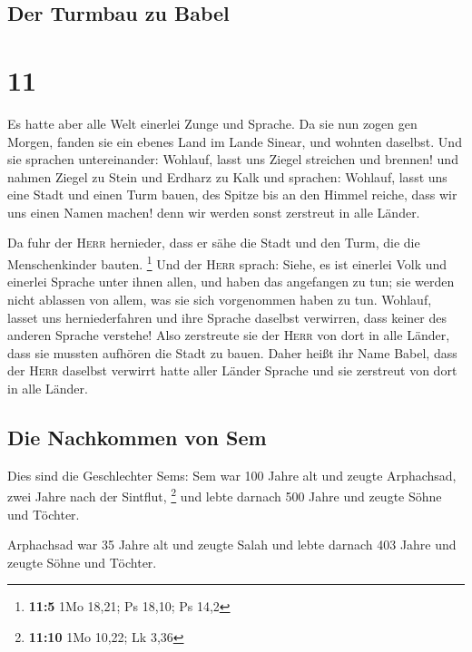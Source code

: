 \hypertarget{der-turmbau-zu-babel}{%
\subsection{Der Turmbau zu Babel}\label{der-turmbau-zu-babel}}

\hypertarget{section-10}{%
\section{11}\label{section-10}}

 Es hatte aber alle Welt einerlei Zunge und Sprache.
 Da sie nun zogen gen Morgen, fanden sie ein ebenes Land
im Lande Sinear, und wohnten daselbst.  Und sie sprachen
untereinander: Wohlauf, lasst uns Ziegel streichen und brennen! und
nahmen Ziegel zu Stein und Erdharz zu Kalk  und sprachen:
Wohlauf, lasst uns eine Stadt und einen Turm bauen, des Spitze bis an
den Himmel reiche, dass wir uns einen Namen machen! denn wir werden
sonst zerstreut in alle Länder.

 Da fuhr der \textsc{Herr} hernieder, dass er sähe die
Stadt und den Turm, die die Menschenkinder bauten. \footnote{\textbf{11:5}
  1Mo 18,21; Ps 18,10; Ps 14,2}  Und der \textsc{Herr}
sprach: Siehe, es ist einerlei Volk und einerlei Sprache unter ihnen
allen, und haben das angefangen zu tun; sie werden nicht ablassen von
allem, was sie sich vorgenommen haben zu tun.  Wohlauf,
lasset uns herniederfahren und ihre Sprache daselbst verwirren, dass
keiner des anderen Sprache verstehe!  Also zerstreute sie
der \textsc{Herr} von dort in alle Länder, dass sie mussten aufhören die
Stadt zu bauen.  Daher heißt ihr Name Babel, dass der
\textsc{Herr} daselbst verwirrt hatte aller Länder Sprache und sie
zerstreut von dort in alle Länder.

\hypertarget{die-nachkommen-von-sem}{%
\subsection{Die Nachkommen von Sem}\label{die-nachkommen-von-sem}}

 Dies sind die Geschlechter Sems: Sem war 100 Jahre alt
und zeugte Arphachsad, zwei Jahre nach der Sintflut, \footnote{\textbf{11:10}
  1Mo 10,22; Lk 3,36}  und lebte darnach 500 Jahre und
zeugte Söhne und Töchter.

 Arphachsad war 35 Jahre alt und zeugte Salah
 und lebte darnach 403 Jahre und zeugte Söhne und
Töchter.

